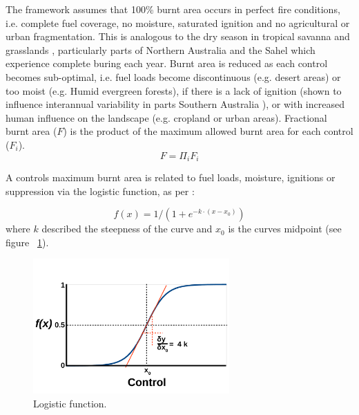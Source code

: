 The framework assumes that 100\% burnt area occurs in perfect fire conditions,  i.e. complete fuel coverage, no moisture, saturated ignition and no agricultural or urban fragmentation. This is analogous to the dry season in tropical savanna and grasslands \citep{kelley2014modelling}, particularly parts of Northern Australia \citep{murphy2013fire} and the Sahel \citep{van2008climate} which experience complete buring each year.
Burnt area is reduced as each control becomes sub-optimal, i.e.
    fuel loads become discontinuous  (e.g. desert areas)
    or too moist (e.g. Humid evergreen forests),
    if there is a lack of ignition (shown to influence interannual variability in parts Southern Australia \cite{bradstock2010biogeographic} ),
    or with increased human influence on the landscape (e.g. cropland or urban areas).
Fractional burnt area ($F$) is the product of the maximum allowed burnt area for each control ($F_i$).
\begin{equation}
    F=\Pi_{i} F_i
    \label{equ:LimFIRE}
\end{equation}

A controls maximum burnt area is related to fuel loads, moisture, ignitions or suppression via the logistic function, as per \citet{bistinas2014causal}:

\begin{equation}
    f(x) = 1 / (1 + e^{-k \cdot (x - x_0)})
    \label{equ:fx}
\end{equation}
where $k$ described the steepness of the curve and $x_0$ is the curves midpoint (see figure ~\ref{fig:Logistic_fun}).

\begin{figure}[!ht]
  \centering
    \includegraphics[width=0.67\textwidth]{Logistic_fun.pdf}
  \caption{Logistic function.}
  \label{fig:Logistic_fun}
\end{figure}

